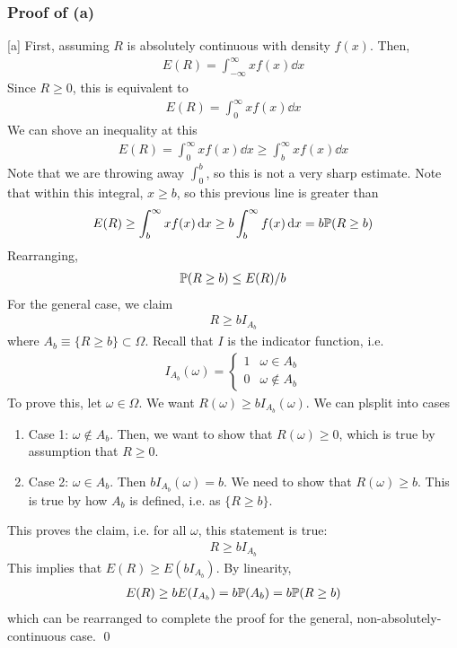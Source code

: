 \subsubsection{Proof of (a)}
[a] First, assuming $R$ is absolutely continuous with density $f(x)$. Then,
\begin{align}
    E(R) = \int_{-\infty}^\infty x f(x) \dd{x}
\end{align}
Since $R \ge 0$, this is equivalent to
\begin{align}
    E(R) = \int_{0}^\infty x f(x) \dd{x}
\end{align}
We can shove an inequality at this
\begin{align}
    E(R) = \int_{0}^\infty x f(x) \dd{x}\ge \int_b^\infty x f(x) \dd{x}
\end{align}
Note that we are throwing away $\int_0^b$, so this is not a very sharp estimate. Note that within this integral, $x \ge b$, so this previous line is greater than
\begin{align}
    E(R) \ge \int_b^\infty x f(x) \dd{x} \ge b\int_b^\infty f(x) \dd{x} = b \mathbb{P}(R \ge b)
\end{align}
Rearranging,
\begin{align}
    \mathbb{P}(R \ge b) \le E(R)/b
\end{align}
For the general case, we claim
\begin{align}
    R \ge b I_{A_b}
\end{align}
where $A_b \equiv \{ R \ge b \} \subset \Omega$. Recall that $I$ is the indicator function, i.e.
\begin{align}
    I_{A_b}(\omega) = \begin{cases}
        1 & \omega \in A_b\\
        0 & \omega \notin A_b
    \end{cases}
\end{align}
To prove this, let $\omega \in \Omega$. We want $R(\omega) \ge b I_{A_b}(\omega)$. We can plsplit into cases
\begin{enumerate}
    \item Case 1: $\omega \notin A_b$. Then, we want to show that $R(\omega) \ge 0$, which is true by assumption that $R \ge 0$.
    \item Case 2: $\omega \in A_b$. Then $b I_{A_b}(\omega) = b$. We need to show that $R(\omega) \ge b$. This is true by how $A_b$ is defined, i.e. as $\{ R \ge b \}$.
\end{enumerate}
This proves the claim, i.e. for all $\omega$, this statement is true:
\begin{align}
    R \ge b I_{A_b}
\end{align}
This implies that $E(R) \ge E(b I_{A_b})$. By linearity,
\begin{align}
    E(R) \ge b E\qty(I_{A_b}) = b\mathbb{P}(A_b) = b \mathbb{P}(R \ge b)
\end{align}
which can be rearranged to complete the proof for the general, non-absolutely-continuous case.
\qed

